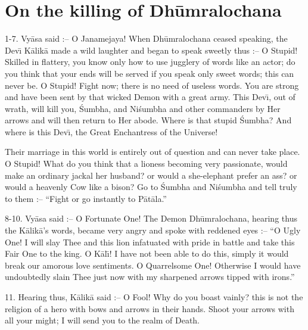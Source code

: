 \chapter{On the killing of Dh\=umralochana}

1-7. Vy\=asa said :-- O Janamejaya! When Dh\=umralochana ceased speaking, the Dev\={\i} K\=alik\=a made a wild laughter and began to speak sweetly thus :-- O Stupid! Skilled in flattery, you know only how to use jugglery of words like an actor; do you think that your ends will be served if you speak only sweet words; this can never be. O Stupid! Fight now; there is no need of useless words. You are strong and have been sent by that wicked Demon with a great army. This Dev\={\i}, out of wrath, will kill you, \'Sumbha, and Ni\'sumbha and other commanders by Her arrows and will then return to Her abode. Where is that stupid \'Sumbha? And where is this Dev\={\i}, the Great Enchantress of the Universe!

Their marriage in this world is entirely out of question and can never take place. O Stupid! What do you think that a lioness becoming very passionate, would make an ordinary jackal her husband? or would a she-elephant prefer an ass? or would a heavenly Cow like a bison? Go to \'Sumbha and Ni\'sumbha and tell truly to them :-- ``Fight or go instantly to P\=at\=ala.''

8-10. Vy\=asa said :-- O Fortunate One! The Demon Dh\=umralochana, hearing thus the K\=alik\=a's words, became very angry and spoke with reddened eyes :-- ``O Ugly One! I will slay Thee and this lion infatuated with pride in battle and take this Fair One to the king. O K\=al\={\i}! I have not been able to do this, simply it would break our amorous love sentiments. O Quarrelsome One! Otherwise I would have undoubtedly slain Thee just now with my sharpened arrows tipped with irons.''

11. Hearing thus, K\=alik\=a said :-- O Fool! Why do you boast vainly? this is not the religion of a hero with bows and arrows in their hands. Shoot your arrows with all your might; I will send you to the realm of Death.

